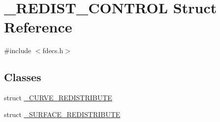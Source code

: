 \hypertarget{struct___r_e_d_i_s_t___c_o_n_t_r_o_l}{}\section{\+\_\+\+R\+E\+D\+I\+S\+T\+\_\+\+C\+O\+N\+T\+R\+OL Struct Reference}
\label{struct___r_e_d_i_s_t___c_o_n_t_r_o_l}


{\ttfamily \#include $<$fdecs.\+h$>$}

\subsection*{Classes}
\begin{DoxyCompactItemize}
\item 
struct \hyperlink{struct___r_e_d_i_s_t___c_o_n_t_r_o_l_d9/d1b/struct___r_e_d_i_s_t___c_o_n_t_r_o_l_1_1___c_u_r_v_e___r_e_d_i_s_t_r_i_b_u_t_e}{\+\_\+\+C\+U\+R\+V\+E\+\_\+\+R\+E\+D\+I\+S\+T\+R\+I\+B\+U\+TE}
\item 
struct \hyperlink{struct___r_e_d_i_s_t___c_o_n_t_r_o_l_1_1___s_u_r_f_a_c_e___r_e_d_i_s_t_r_i_b_u_t_e}{\+\_\+\+S\+U\+R\+F\+A\+C\+E\+\_\+\+R\+E\+D\+I\+S\+T\+R\+I\+B\+U\+TE}
\end{DoxyCompactItemize}
